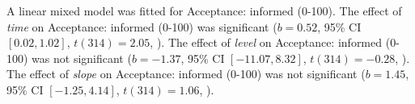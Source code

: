 A linear mixed model was fitted for Acceptance: informed (0-100).
The effect of \textit{time} on Acceptance: informed (0-100) was significant ($b = 0.52$, 95\% CI $[0.02, 1.02]$, $t(314) = 2.05$, ).
The effect of \textit{level} on Acceptance: informed (0-100) was not significant ($b = -1.37$, 95\% CI $[-11.07, 8.32]$, $t(314) = -0.28$, ).
The effect of \textit{slope} on Acceptance: informed (0-100) was not significant ($b = 1.45$, 95\% CI $[-1.25, 4.14]$, $t(314) = 1.06$, ).
